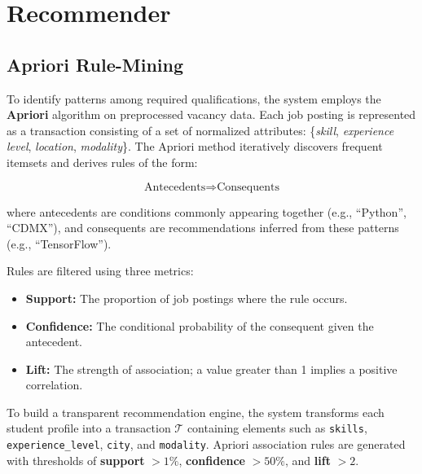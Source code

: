 \documentclass[runningheads]{llncs}
\begin{document}
	\section{Recommender}
	
	\subsection{Apriori Rule-Mining}
	
	To identify patterns among required qualifications, the system employs the \textbf{Apriori} algorithm on preprocessed vacancy data. Each job posting is represented as a transaction consisting of a set of normalized attributes: \{\emph{skill}, \emph{experience level}, \emph{location}, \emph{modality}\}. The Apriori method iteratively discovers frequent itemsets and derives rules of the form:
	
	\[
	\text{Antecedents} \Rightarrow \text{Consequents}
	\]
	
	where antecedents are conditions commonly appearing together (e.g., ``Python'', ``CDMX''), and consequents are recommendations inferred from these patterns (e.g., ``TensorFlow'').
	
	Rules are filtered using three metrics:
	\begin{itemize}
		\item \textbf{Support:} The proportion of job postings where the rule occurs.
		\item \textbf{Confidence:} The conditional probability of the consequent given the antecedent.
		\item \textbf{Lift:} The strength of association; a value greater than 1 implies a positive correlation.
	\end{itemize}
	
	To build a transparent recommendation engine, the system transforms each student profile into a transaction $\mathcal{T}$ containing elements such as \texttt{skills}, \texttt{experience\_level}, \texttt{city}, and \texttt{modality}. Apriori association rules are generated with thresholds of \textbf{support} $> 1\%$, \textbf{confidence} $> 50\%$, and \textbf{lift} $> 2$. 
	
\end{document}
